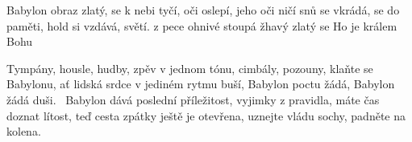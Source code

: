 \begin{TEXT}{Babylon}
\SLOKA {} obraz zlatý,  se k nebi tyčí,\NL
{} oči oslepí,  jeho oči ničí \NL
{} snů se vkrádá,  se do paměti,\NL
{} hold si vzdává,   světí.
\REFREN  {} z pece ohnivé  stoupá žhavý \NL
{} zlatý  se \NL
Ho  je králem \NL 
{} Bohu   

\SLOKA Tympány, housle, hudby, zpěv v jednom tónu,\NL
cimbály, pozouny, klaňte se Babylonu,\NL
ať lidská srdce v jediném rytmu buší,\NL
Babylon poctu žádá, Babylon žádá duši.  \REFREN \,
\SLOKA Babylon dává poslední příležitost,\NL
vyjimky z pravidla, máte čas doznat lítost,\NL
teď cesta zpátky ještě je otevřena, \NL
uznejte vládu sochy, padněte na kolena.
\REFREN \, 
\end{TEXT}
